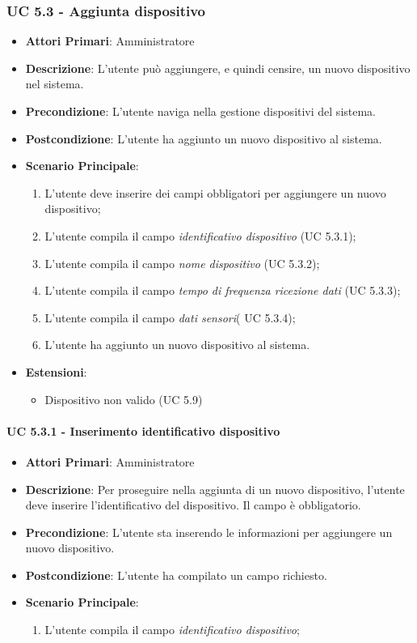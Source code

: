 			\subsubsection{UC 5.3 - Aggiunta dispositivo}
			\begin{itemize}
				\item \textbf{Attori Primari}: Amministratore
				\item \textbf{Descrizione}: L'utente può aggiungere, e quindi censire, un nuovo dispositivo nel sistema.
				\item \textbf{Precondizione}: L'utente naviga nella gestione dispositivi del sistema.
				\item \textbf{Postcondizione}: L'utente ha aggiunto un nuovo dispositivo al sistema.
				\item \textbf{Scenario Principale}:
				\begin{enumerate}
					\item{L'utente deve inserire dei campi obbligatori per aggiungere un nuovo dispositivo;}
					\item{L'utente compila il campo \textit{identificativo dispositivo} (UC 5.3.1);}
					\item{L'utente compila il campo \textit{nome dispositivo} (UC 5.3.2);}
					\item{L'utente compila il campo \textit{tempo di frequenza ricezione dati} (UC 5.3.3);}
					\item{L'utente compila il campo \textit{dati sensori}( UC 5.3.4); }
					\item{L'utente ha aggiunto un nuovo dispositivo al sistema.}
				\end{enumerate}
				\item \textbf{Estensioni}:
				\begin{itemize}
					\item Dispositivo non valido (UC 5.9)
				\end{itemize}
			\end{itemize}

				\paragraph{UC 5.3.1 - Inserimento identificativo dispositivo}
				\begin{itemize}
					\item \textbf{Attori Primari}: Amministratore
					\item \textbf{Descrizione}: Per proseguire nella aggiunta di un nuovo dispositivo, l'utente deve inserire l'identificativo del dispositivo. Il campo è obbligatorio.
					\item \textbf{Precondizione}: L'utente sta inserendo le informazioni per aggiungere un nuovo dispositivo.
					\item \textbf{Postcondizione}: L'utente ha compilato un campo richiesto.
					\item \textbf{Scenario Principale}:
					\begin{enumerate}
						\item{L'utente compila il campo \textit{identificativo dispositivo};}
					\end{enumerate}
				\end{itemize}

